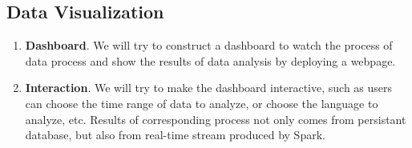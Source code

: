 \subsection{Data Visualization}
\begin{enumerate}
    \item \textbf{Dashboard}. We will try to construct a dashboard to watch the process of data process and show the results of data analysis by deploying a webpage.
    \item \textbf{Interaction}. We will try to make the dashboard interactive, such as users can choose the time range of data to analyze, or choose the language to analyze, etc. Results of corresponding process not only comes from persistant database, but also from real-time stream produced by Spark.
\end{enumerate}






